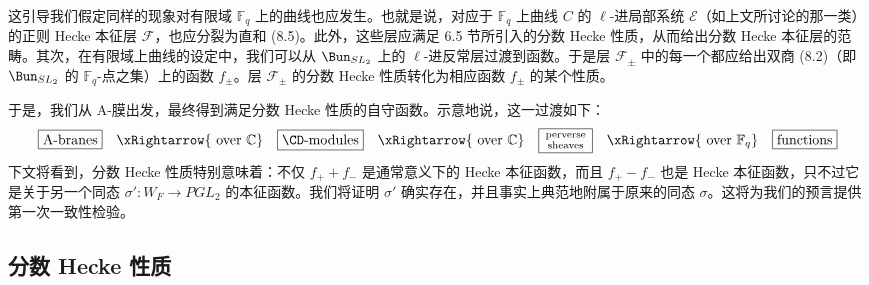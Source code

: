 这引导我们假定同样的现象对有限域 $\mathbb{F}_q$ 上的曲线也应发生。也就是说，对应于 $\mathbb{F}_q$ 上曲线 $C$ 的 $\ell$-进局部系统 $\mathcal{E}$（如上文所讨论的那一类）的正则 Hecke 本征层 $\mathcal{F}$，也应分裂为直和 (8.5)。此外，这些层应满足 6.5 节所引入的分数 Hecke 性质，从而给出分数 Hecke 本征层的范畴。其次，在有限域上曲线的设定中，我们可以从 $\Bun_{SL_2}$ 上的 $\ell$-进反常层过渡到函数。于是层 $\mathcal{F}_\pm$ 中的每一个都应给出双商 (8.2)（即 $\Bun_{SL_2}$ 的 $\mathbb{F}_q$-点之集）上的函数 $f_\pm$。层 $\mathcal{F}_\pm$ 的分数 Hecke 性质转化为相应函数 $f_\pm$ 的某个性质。

于是，我们从 A-膜出发，最终得到满足分数 Hecke 性质的自守函数。示意地说，这一过渡如下：
\[
\begin{array}{ccccccc}
\boxed{\text{A-branes}} & \xRightarrow{\ \text{over }\mathbb{C}} &
\boxed{\CD\text{-modules}} & \xRightarrow{\ \text{over }\mathbb{C}} &
\boxed{\begin{smallmatrix}\text{perverse}\\ \text{sheaves}\end{smallmatrix}} & \xRightarrow{\ \text{over }\mathbb{F}_q} &
\boxed{\text{functions}}
\end{array}
\]
下文将看到，分数 Hecke 性质特别意味着：不仅 $f_+ + f_-$ 是通常意义下的 Hecke 本征函数，而且 $f_+ - f_-$ 也是 Hecke
本征函数，只不过它是关于另一个同态 $\sigma' : W_F \to PGL_2$ 的本征函数。我们将证明 $\sigma'$ 确实存在，并且事实上典范地附属于原来的同态 $\sigma$。这将为我们的预言提供第一次一致性检验。

\subsection{分数 Hecke 性质}

